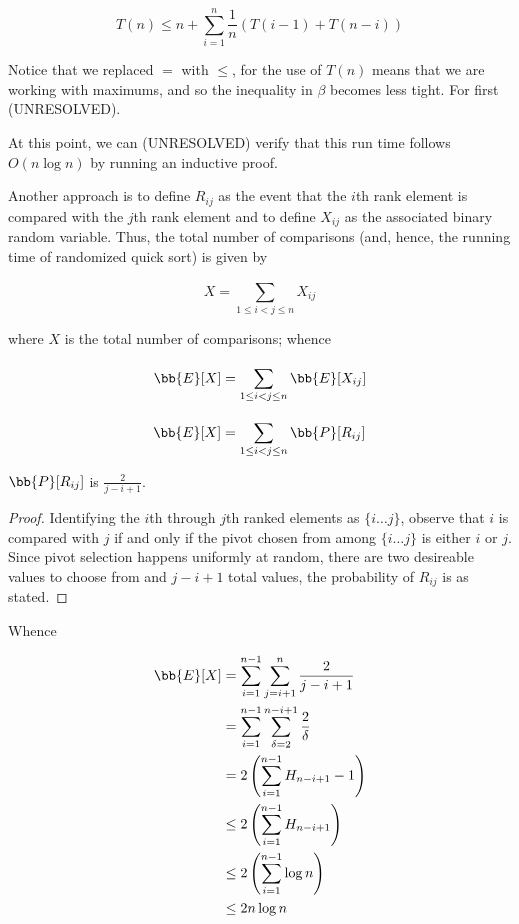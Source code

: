 \documentclass[../main.tex]{subfiles}
\begin{document}
\[
    T(n) \leq n + \sum_{i=1}^{n}\frac{1}{n}\left( T(i-1) + T(n-i) \right)
\]

Notice that we replaced $=$ with $\leq$, for the use of $T(n)$ means that we are working with maximums, and so the inequality in $\beta$ becomes less tight. For first (UNRESOLVED).

At this point, we can (UNRESOLVED) verify that this run time follows $O(n \log n)$ by running an inductive proof.

Another approach is to define $R_{ij}$ as the event that the $i$th rank element is compared with the $j$th rank element and to define $X_{ij}$ as the associated binary random variable. Thus, the total number of comparisons (and, hence, the running time of randomized quick sort) is given by 

\[
    X = \sum_{1 \leq i < j \leq n }^{}X_{ij}
\]

where $X$ is the total number of comparisons; whence

\[
    \bb{E}[X] = \sum_{1 \leq i < j \leq n }^{}\bb{E}[X_{ij}]
\]


\[
    \bb{E}[X] = \sum_{1 \leq i < j \leq n }^{}\bb{P}[R_{ij}]
\]

\begin{lemma}
    $\bb{P}[R_{ij}]$ is $\frac{2}{j-i+1}$.
\end{lemma}

\begin{proof}
    Identifying the $i$th through $j$th ranked elements as $\{i \dots j\}$, observe that $i$ is compared with $j$ if and only if the pivot chosen from among $\{i \dots j\}$ is either $i$ or $j$. Since pivot selection happens uniformly at random, there are two desireable values to choose from and $j - i + 1$ total values, the probability of $R_{ij}$ is as stated.
\end{proof}

Whence

\begin{align*}
    \bb{E}[X] &= \sum_{i=1}^{n-1}\sum_{j=i+1}^{n}\frac{2}{j-i+1} \\
    &= \sum_{i=1}^{n-1}\sum_{\delta=2}^{n-i+1}\frac{2}{\delta} \\
    &= 2 \left(\sum_{i=1}^{n-1} H_{n-i+1} - 1\right)  \\
    &\leq  2 \left(\sum_{i=1}^{n-1} H_{n-i+1} \right)  \\
    &\leq  2 \left(\sum_{i=1}^{n-1} \log n \right)  \\
    &\leq  2 n \log n  \\
\end{align*}
\end{document}
